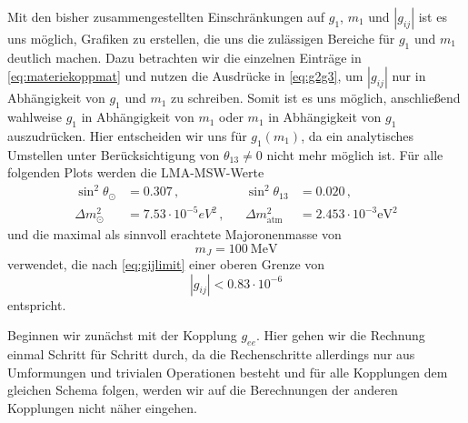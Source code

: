 Mit den bisher zusammengestellten Einschränkungen auf $g_1$, $m_1$ und $|g_{i j}|$ ist es uns möglich, Grafiken zu erstellen, die uns die zulässigen Bereiche für $g_1$ und $m_1$ deutlich machen.
Dazu betrachten wir die einzelnen Einträge in \eqref{eq:materiekoppmat} und nutzen die Ausdrücke in \eqref{eq:g2g3}, um $|g_{i j}|$ nur in Abhängigkeit von $g_1$ und $m_1$ zu schreiben.
Somit ist es uns möglich, anschließend wahlweise $g_1$ in Abhängigkeit von $m_1$ oder $m_1$ in Abhängigkeit von $g_1$ auszudrücken.
Hier entscheiden wir uns für $g_1 (m_1)$, da ein analytisches Umstellen unter Berücksichtigung von $\theta_{1 3} \neq 0$ nicht mehr möglich ist.
Für alle folgenden Plots werden die LMA-MSW-Werte
\begin{align}
    \sin^2\theta_\odot &= \num{0.307}\,, && \sin^2\theta_{13} &= \num{0.020}\,, \\ \Delta m^2_\odot &= \num{7.53} \cdot 10^{-5} \si{eV}^2\,, && \Delta m^2_\text{atm} &= \num{2.453} \cdot 10^{-3} \si{\eV}^2
    \label{eq:LMAMSW}
\end{align}
und die maximal als sinnvoll erachtete Majoronenmasse von 
\begin{equation*}
    m_J = \SI{100}{\mega\eV}
\end{equation*}
\cite{neutrinospdg, newlimit} verwendet, die nach \eqref{eq:gijlimit} einer oberen Grenze von
\begin{equation*}
    |g_{ij}| < \num{0.83} \cdot 10^{-6}
\end{equation*}
entspricht.

Beginnen wir zunächst mit der Kopplung $g_{ee}$.
Hier gehen wir die Rechnung einmal Schritt für Schritt durch, da die Rechenschritte allerdings nur aus Umformungen und trivialen Operationen besteht und für alle Kopplungen dem gleichen Schema folgen, werden wir auf die Berechnungen der anderen
Kopplungen nicht näher eingehen.

